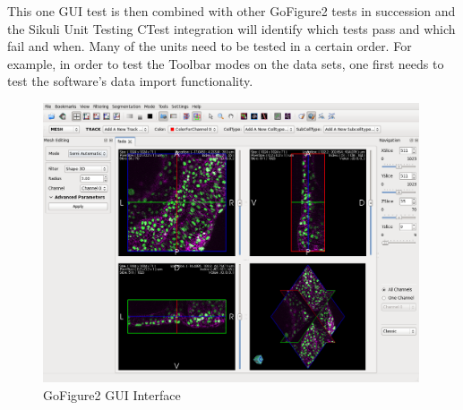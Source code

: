 \documentclass{InsightArticle}
\begin{document}
This one GUI test is then combined with other GoFigure2 tests in succession and
the Sikuli Unit Testing CTest integration will identify which tests pass and
which fail and when. Many of the units need to be tested in a certain order.
For example, in order to test the Toolbar modes on the data sets, one first
needs to test the software's data import functionality.

\begin{figure}[htbp]
 \centering
 \includegraphics[width=0.99\textwidth]{Images/Gofigure2GUI.png}
 \caption{GoFigure2 GUI Interface}
 \label{fig:GoFigure2GUI}
\end{figure}
\end{document}
